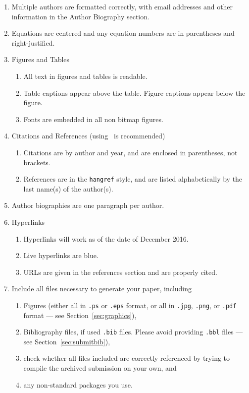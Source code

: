 \documentclass{wscpaperproc}
\theoremstyle{wsc}
\begin{document}
\begin{enumerate}
	\item Multiple authors are formatted correctly, with email addresses and other information in the Author Biography section.
	\item Equations are centered and any equation numbers are in parentheses and right-justified.
	\item Figures and Tables
	\begin{enumerate}
		\item All text in figures and tables is readable.
		\item Table captions appear above the table. Figure captions appear below the figure.
		\item Fonts are embedded in all non bitmap figures.
	\end{enumerate}
	\item Citations and References (using \BibTeX\ is recommended)
	\begin{enumerate}
		\item Citations are by author and year, and are enclosed in parentheses, not brackets.
		\item References are in the {\tt hangref} style, and are listed alphabetically by the last name(s) of the author(s).
	\end{enumerate}
	\item Author biographies are one paragraph per author.
	\item Hyperlinks
	\begin{enumerate}
		\item Hyperlinks will work as of the date of December 2016.
		\item Live hyperlinks are blue.
		\item URLs are given in the references section and are properly cited.
	\end{enumerate}
	\item Include all files necessary to generate your paper, including
	\begin{enumerate}
		\item Figures (either all in {\tt .ps} or {\tt .eps} format, or all in {\tt .jpg}, {\tt .png}, or {\tt .pdf} format --- see Section~\ref{sec:graphics}),
		\item Bibliography files, if used {\tt .bib} files. Please avoid providing {\tt .bbl} files --- see Section~\ref{sec:submitbib}),
		\item check whether all files included are correctly referenced by trying to compile the archived submission on your own, and
		\item any non-standard packages you use.
	\end{enumerate}
\end{enumerate}
\end{document}
